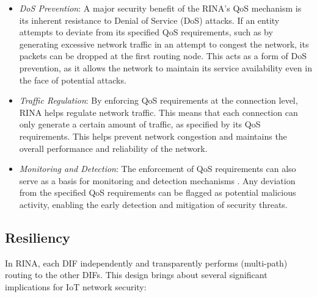 \documentclass{ieeeaccess}
\begin{document}
\begin{itemize}
	\item \textit{DoS Prevention}: A major security benefit of the RINA's QoS mechanism is its inherent resistance to Denial of Service (DoS) attacks. If an entity attempts to deviate from its specified QoS requirements, such as by generating excessive network traffic in an attempt to congest the network, its packets can be dropped at the first routing node. This acts as a form of DoS prevention, as it allows the network to maintain its service availability even in the face of potential attacks.
	\item \textit{Traffic Regulation}: By enforcing QoS requirements at the connection level, RINA helps regulate network traffic. This means that each connection can only generate a certain amount of traffic, as specified by its QoS requirements. This helps prevent network congestion and maintains the overall performance and reliability of the network.
	\item \textit{Monitoring and Detection}: The enforcement of QoS requirements can also serve as a basis for monitoring and detection mechanisms \cite{protogerou2021graph}. Any deviation from the specified QoS requirements can be flagged as potential malicious activity, enabling the early detection and mitigation of security threats.
\end{itemize}

\subsection{Resiliency}
In RINA, each DIF independently and transparently performs (multi-path) routing to the other DIFs. This design brings about several significant implications for IoT network security:
\end{document}
